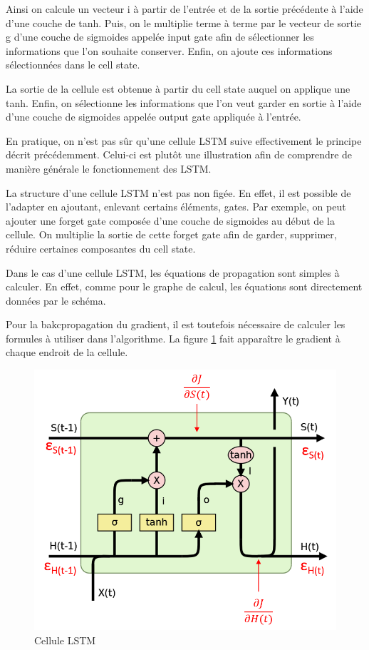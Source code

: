 \documentclass{report}
\theoremstyle{plain}
\theoremstyle{definition}
\theoremstyle{remark}
\begin{document}
Ainsi on calcule un vecteur i à partir de l'entrée et de la sortie précédente à l'aide d'une couche de tanh. Puis, on le multiplie terme à terme par le vecteur de sortie g d'une couche de sigmoides appelée input gate afin de sélectionner les informations que l'on souhaite conserver. Enfin, on ajoute ces informations sélectionnées dans le cell state. 

La sortie de la cellule est obtenue à partir du cell state auquel on applique une tanh. Enfin, on sélectionne les informations que l'on veut garder en sortie à l'aide d'une couche de sigmoides appelée output gate appliquée à l'entrée.


En pratique, on n'est pas sûr qu'une cellule LSTM suive effectivement le principe décrit précédemment. Celui-ci est plutôt une illustration afin de comprendre de manière générale le fonctionnement des LSTM.

La structure d'une cellule LSTM n'est pas non figée. En effet, il est possible de l'adapter en ajoutant, enlevant certains éléments, gates. Par exemple, on peut ajouter une forget gate composée d'une couche de sigmoides au début de la cellule. On multiplie la sortie de cette forget gate afin de garder, supprimer, réduire certaines composantes du cell state. 

\break

Dans le cas d'une cellule LSTM, les équations de propagation sont simples à calculer. En effet, comme pour le graphe de calcul, les équations sont directement données par le schéma.

Pour la bakcpropagation du gradient, il est toutefois nécessaire de calculer les formules à utiliser dans l'algorithme. La figure \ref{cellule LSTM gradient} fait apparaître le gradient à chaque endroit de la cellule.

\begin{figure}[h!]
\begin{center}
\includegraphics[scale=0.3]{images/LSTM_gradient.png}
\caption{Cellule LSTM}
\label{cellule LSTM gradient}
\end{center}
\end{figure}
\end{document}
